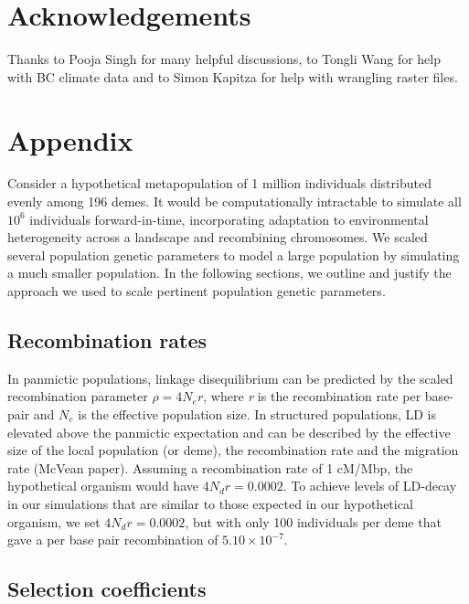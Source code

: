 \documentclass[10pt,twoside,lineno, twocolumn]{GSA_format}
\newcommand{\beginsupplement}{%
        \setcounter{table}{0}
        \renewcommand{\thetable}{S\arabic{table}}%
        \setcounter{figure}{0}
        \renewcommand{\thefigure}{S\arabic{figure}}%
     }
\begin{document}
\section{Acknowledgements}

Thanks to Pooja Singh for many helpful discussions, to Tongli Wang for help with BC climate data and to Simon Kapitza for help with wrangling raster files. \\




\beginsupplement
\onecolumn
\section{Appendix}


Consider a hypothetical metapopulation of 1 million individuals distributed evenly among 196 demes. It would be computationally intractable to simulate all $10^6$ individuals forward-in-time, incorporating adaptation to environmental heterogeneity across a landscape and recombining chromosomes. We scaled several population genetic parameters to model a large population by simulating a much smaller population. In the following sections, we outline and justify the approach we used to scale pertinent population genetic parameters. 

\subsection{Recombination rates}

In panmictic populations, linkage disequilibrium can be predicted by the scaled recombination parameter $\rho = 4N_er$, where \textit{r} is the recombination rate per base-pair and $N_e$ is the effective population size. In structured populations, LD is elevated above the panmictic expectation and can be described by the effective size of the local population (or deme), the recombination rate and the migration rate (McVean paper). Assuming a recombination rate of 1 cM/Mbp, the hypothetical organism would have $4N_dr = 0.0002$. To achieve levels of LD-decay in our simulations that are similar to those expected in our hypothetical organism, we set $4N_dr = 0.0002$, but with only 100 individuals per deme that gave a per base pair recombination of $5.10 \times 10^{-7}$.

\subsection{Selection coefficients} 
\end{document}
